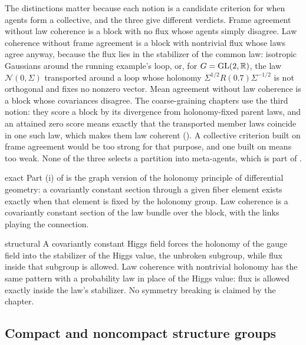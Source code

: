 The distinctions matter because each notion is a candidate criterion for when agents form a collective,
and the three give different verdicts. Frame agreement without law coherence is a block with no flux whose
agents simply disagree. Law coherence without frame agreement is a block with nontrivial flux whose laws
agree anyway, because the flux lies in the stabilizer of the common law: isotropic Gaussians around the
running example's loop, or, for $G=\mathrm{GL}(2,\mathbb R)$, the law $\mathcal N(0,\Sigma)$ transported around a loop
whose holonomy $\Sigma^{1/2}R(0.7)\Sigma^{-1/2}$ is not orthogonal and fixes no nonzero vector. Mean
agreement without law coherence is a block whose covariances disagree. The coarse-graining chapters use the
third notion: they score a block by its divergence from holonomy-fixed parent laws, and an attained zero score
means exactly that the transported member laws coincide in one such law, which makes them law coherent
(). A collective criterion built on frame agreement would be too strong for that
purpose, and one built on means too weak. None of the three selects a partition into meta-agents,
which is part of .

\begin{analogy}{exact}
Part (i) of  is the graph version of the holonomy principle of differential
geometry: a covariantly constant section through a given fiber element exists exactly when that element is
fixed by the holonomy group. Law coherence is a covariantly constant section of the law bundle over the
block, with the links playing the connection.
\end{analogy}

\begin{analogy}{structural}
A covariantly constant Higgs field forces the holonomy of the gauge field into the stabilizer of the Higgs
value, the unbroken subgroup, while flux inside that subgroup is allowed. Law coherence with nontrivial
holonomy has the same pattern with a probability law in place of the Higgs value: flux is allowed exactly
inside the law's stabilizer. No symmetry breaking is claimed by the chapter.
\end{analogy}

\subsection{Compact and noncompact structure groups}


